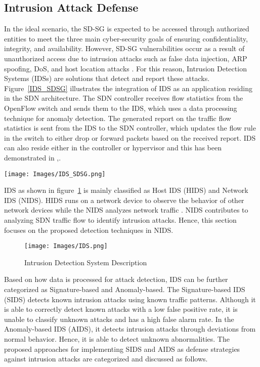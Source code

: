 \documentclass[conference]{IEEEtran}
\begin{document}
\subsection{Intrusion Attack Defense}
In the ideal scenario, the SD-SG is expected to be accessed through authorized entities to meet the three main cyber-security goals of ensuring confidentiality, integrity, and availability. However, SD-SG vulnerabilities occur as a result of unauthorized access due to intrusion attacks such as false data injection, ARP spoofing, DoS, and host location attacks \cite{rehmani2019software}. For this reason, Intrusion Detection Systems (IDSs) are solutions that detect and report these attacks.
Figure~\ref{IDS_SDSG} illustrates the integration of IDS as an application residing in the SDN architecture. The SDN controller receives flow statistics from the OpenFlow switch and sends them to the IDS, which uses a data processing technique for anomaly detection. The generated report on the traffic flow statistics is sent from the IDS to the SDN controller, which updates the flow rule in the switch to either drop or forward packets based on the received report. IDS can also reside either in the controller or hypervisor and this has been demonstrated in \cite{10.1007/978-3-030-02931-9_7},\cite{8746112}.
\begin{figure*}[h]
\centering
\texttt{[image: Images/IDS\_SDSG.png]}
\caption{IDS Integration in SD-SG Architecture}
\label{IDS_SDSG}
\end{figure*}
IDS as shown in figure~\ref{IDS} is mainly classified as Host IDS (HIDS) and Network IDS (NIDS). HIDS runs on a network device to observe the behavior of other network devices while the NIDS analyzes network traffic \cite{BHARDWAJ2022100580}. NIDS contributes to analyzing SDN traffic flow to identify intrusion attacks. Hence, this section focuses on the proposed detection techniques in NIDS.
\begin{figure}[h]
\centering
\texttt{[image: Images/IDS.png]}
\caption{Intrusion Detection System Description }
\label{IDS}
\end{figure}
Based on how data is processed for attack detection, IDS can be further categorized as Signature-based and Anomaly-based. The Signature-based IDS (SIDS) detects known intrusion attacks using known traffic patterns. Although it is able to correctly detect known attacks with a low false positive rate, it is unable to classify unknown attacks and has a high false alarm rate. In the Anomaly-based IDS (AIDS), it detects intrusion attacks through deviations from normal behavior. Hence, it is able to detect unknown abnormalities. The proposed approaches for implementing SIDS and AIDS as defense strategies against intrusion attacks are categorized and discussed as follows.
\end{document}
